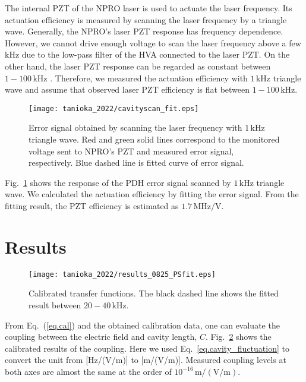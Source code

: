 The internal PZT of the NPRO laser is used to actuate the laser frequency.
Its actuation efficiency is measured by scanning the laser frequency by a triangle wave.
Generally, the NPRO's laser PZT response has frequency dependence.
However, we cannot drive enough voltage to scan the laser frequency above a few kHz due to the low-pass filter of the HVA connected to the laser PZT.
On the other hand, the laser PZT response can be regarded as constant between $1 - 100\, \mathrm{kHz}$ \cite{klog}.
Therefore, we measured the actuation efficiency with $1\, \mathrm{kHz}$ triangle wave and assume that observed laser PZT efficiency is flat between $1 - 100 \, \mathrm{kHz}$.


\begin{figure}[htbp]
    \centering
\texttt{[image: tanioka\_2022/cavityscan\_fit.eps]}
\caption{
Error signal obtained by scanning the laser frequency with $1\, \mathrm{kHz}$ triangle wave.
Red and green solid lines correspond to the monitored voltage sent to NPRO's PZT and measured error signal, respectively.
Blue dashed line is fitted curve of error signal.
}
\label{fig.scan}
\end{figure}

Fig.~\ref{fig.scan} shows the response of the PDH error signal scanned by $1\, \mathrm{kHz}$ triangle wave.
We calculated the actuation efficiency by fitting the error signal.
From the fitting result, the PZT efficiency is estimated as $1.7\, \mathrm{MHz/V}$.


\section{Results}

\begin{figure}[htbp]
\texttt{[image: tanioka\_2022/results\_0825\_PSfit.eps]}
\caption{
Calibrated transfer functions.
The black dashed line shows the fitted result between $20 - 40\, \mathrm{kHz}$.
}
\label{fig.result}
\end{figure}

From Eq.~(\ref{eq.cal}) and the obtained calibration data, one can evaluate the coupling between the electric field and cavity length, $C$.
Fig.~\ref{fig.result} shows the calibrated results of the coupling. 
Here we used Eq.~\ref{eq.cavity_fluctuation} to convert the unit from [Hz/(V/m)] to [m/(V/m)].
Measured coupling levels at both axes are almost the same at the order of $10^{-16}\, \mathrm{m/(V/m)}$.

